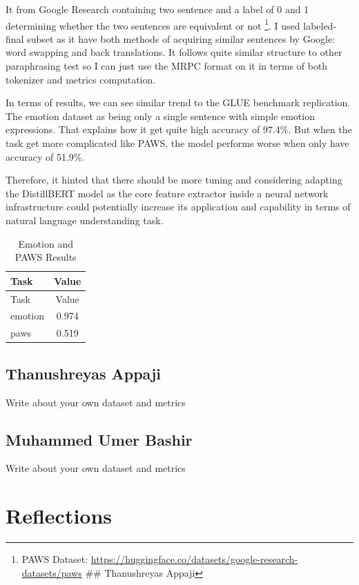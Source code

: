 \documentclass[
  11pt,
]{article}
\begin{document}
It from Google Research containing two sentence and a label of 0 and 1
determining whether the two sentences are equivalent or not \footnote{PAWS
  Dataset:
  \url{https://huggingface.co/datasets/google-research-datasets/paws}
  \#\# Thanushreyas Appaji}. I used labeled-final subset as it have both
methods of acquiring similar sentences by Google: word swapping and back
translations. It follows quite similar structure to other paraphrasing
test so I can just use the MRPC format on it in terms of both tokenizer
and metrics computation.

In terms of results, we can see similar trend to the GLUE benchmark
replication. The emotion dataset as being only a single sentence with
simple emotion expressions. That explains how it get quite high accuracy
of 97.4\%. But when the task get more complicated like PAWS, the model
performs worse when only have accuracy of 51.9\%.

Therefore, it hinted that there should be more tuning and considering
adapting the DistillBERT model as the core feature extractor inside a
neural network infrastructure could potentially increase its application
and capability in terms of natural language understanding task.

\begin{longtable}[]{@{}lc@{}}
\caption{Emotion and PAWS Results}\tabularnewline
\toprule\noalign{}
Task & Value \\
\midrule\noalign{}
\endfirsthead
\toprule\noalign{}
Task & Value \\
\midrule\noalign{}
\endhead
\bottomrule\noalign{}
\endlastfoot
emotion & 0.974 \\
paws & 0.519 \\
\end{longtable}

\subsection{Thanushreyas Appaji}\label{thanushreyas-appaji}

Write about your own dataset and metrics

\subsection{Muhammed Umer Bashir}\label{muhammed-umer-bashir}

Write about your own dataset and metrics

\section{Reflections}\label{reflections}
\end{document}
